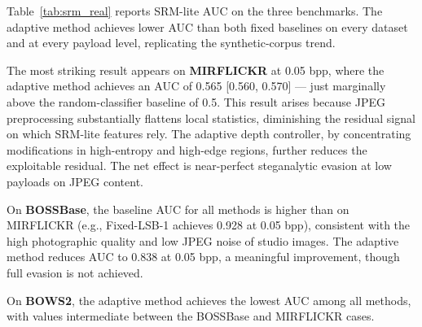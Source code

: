 Table~\ref{tab:srm_real} reports SRM-lite AUC on the three benchmarks. The adaptive method achieves lower AUC than both fixed baselines on every dataset and at every payload level, replicating the synthetic-corpus trend.

The most striking result appears on \textbf{MIRFLICKR} at 0.05 bpp, where the adaptive method achieves an AUC of 0.565 [0.560, 0.570] --- just marginally above the random-classifier baseline of 0.5. This result arises because JPEG preprocessing substantially flattens local statistics, diminishing the residual signal on which SRM-lite features rely. The adaptive depth controller, by concentrating modifications in high-entropy and high-edge regions, further reduces the exploitable residual. The net effect is near-perfect steganalytic evasion at low payloads on JPEG content.

On \textbf{BOSSBase}, the baseline AUC for all methods is higher than on MIRFLICKR (e.g., Fixed-LSB-1 achieves 0.928 at 0.05 bpp), consistent with the high photographic quality and low JPEG noise of studio images. The adaptive method reduces AUC to 0.838 at 0.05 bpp, a meaningful improvement, though full evasion is not achieved.

On \textbf{BOWS2}, the adaptive method achieves the lowest AUC among all methods, with values intermediate between the BOSSBase and MIRFLICKR cases.

